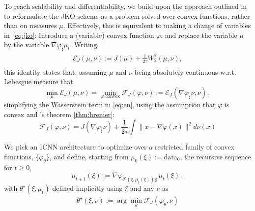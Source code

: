  To reach scalability and differentiability, we build upon the approach outlined in \citet{benamou2016discretization} to reformulate the \acrshort{JKO} scheme as a problem solved over convex functions, rather than on measures $\mu$. Effectively, this is equivalent to making a change of variables in~\eqref{eq:jko}: Introduce a (variable) convex function $\varphi$, and replace the variable $\mu$ by the variable $\nabla \varphi_{\sharp}\mu_t$. Writing
\begin{equation}\label{eq:en}
\begin{split}
\mathcal{E}_J(\mu, \nu) := J(\mu) +\frac{1}{2 \tau}W_2^2(\mu, \nu),\\
\end{split}
\end{equation}
this identity states that, assuming $\mu$ and $\nu$ being absolutely continuous w.r.t. Lebesgue measure that
$$\min_{\mu}\mathcal{E}_J(\mu,\nu) = \min_{\varphi \text{ convex}} \mathcal{F}_J(\varphi, \nu):= \mathcal{E}_J(\nabla \varphi_{\sharp}\nu, \nu)\,,$$
simplifying the Wasserstein term in \eqref{eq:en}, using the assumption that $\varphi$ is convex and \citeauthor{brenier1987decomposition}'s theorem \cref{thm:brenier}:
\begin{equation}\mathcal{F}_J(\varphi, \nu) = J(\nabla \varphi_{\sharp}\nu) +\frac{1}{2 \tau} \!\! \int\!\! \| x - \nabla \varphi(x) \|^2 d \nu(x)\label{eq:jko_psi}
\end{equation}

We pick an ICNN architecture to optimize over a restricted family of convex functions, $\{\varphi_{\theta}\}$, and define, starting from $\mu_0(\xi):=\mathrm{data}_0$, the recursive sequence for $t\geq 0$,
\begin{equation} \label{eq:next_pop}
\mu_{t+1}(\xi) := \nabla \varphi_{\theta^\star\!(\xi, \mu_t(\xi))\, \sharp}\, \mu_{t}(\xi)\,,
\end{equation}
with $\theta^\star(\xi, \mu_t)$ defined implicitly using $\xi$ and any $\nu$ as 
\begin{align} \label{eq:thetastar}
    \theta^\star(\xi, \nu):=\arg \min_{\theta} \mathcal{F}_J(\varphi_{\theta},\nu)
\end{align}

